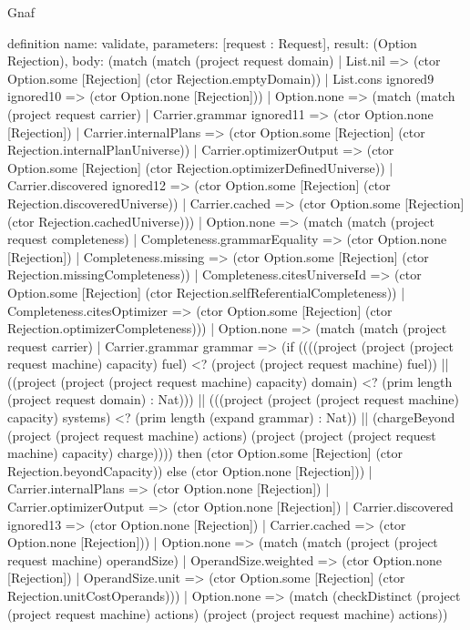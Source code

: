 \begin{lexlean}{Gnaf}
\begin{semanticmodule}
definition{
  name: validate,
  parameters: [request : Request],
  result: (Option Rejection),
  body: (match (match (project request domain)
      | List.nil => (ctor Option.some [Rejection] (ctor Rejection.emptyDomain))
      | List.cons ignored9 ignored10 => (ctor Option.none [Rejection]))
    | Option.none => (match (match (project request carrier)
        | Carrier.grammar ignored11 => (ctor Option.none [Rejection])
        | Carrier.internalPlans => (ctor Option.some [Rejection] (ctor Rejection.internalPlanUniverse))
        | Carrier.optimizerOutput => (ctor Option.some [Rejection] (ctor Rejection.optimizerDefinedUniverse))
        | Carrier.discovered ignored12 => (ctor Option.some [Rejection] (ctor Rejection.discoveredUniverse))
        | Carrier.cached => (ctor Option.some [Rejection] (ctor Rejection.cachedUniverse)))
      | Option.none => (match (match (project request completeness)
          | Completeness.grammarEquality => (ctor Option.none [Rejection])
          | Completeness.missing => (ctor Option.some [Rejection] (ctor Rejection.missingCompleteness))
          | Completeness.citesUniverseId => (ctor Option.some [Rejection] (ctor Rejection.selfReferentialCompleteness))
          | Completeness.citesOptimizer => (ctor Option.some [Rejection] (ctor Rejection.optimizerCompleteness)))
        | Option.none => (match (match (project request carrier)
            | Carrier.grammar grammar => (if ((((project (project (project request machine) capacity) fuel) <? (project (project request machine) fuel)) || ((project (project (project request machine) capacity) domain) <? (prim length (project request domain) : Nat))) || (((project (project (project request machine) capacity) systems) <? (prim length (expand grammar) : Nat)) || (chargeBeyond (project (project request machine) actions) (project (project (project request machine) capacity) charge)))) then (ctor Option.some [Rejection] (ctor Rejection.beyondCapacity)) else (ctor Option.none [Rejection]))
            | Carrier.internalPlans => (ctor Option.none [Rejection])
            | Carrier.optimizerOutput => (ctor Option.none [Rejection])
            | Carrier.discovered ignored13 => (ctor Option.none [Rejection])
            | Carrier.cached => (ctor Option.none [Rejection]))
          | Option.none => (match (match (project (project request machine) operandSize)
              | OperandSize.weighted => (ctor Option.none [Rejection])
              | OperandSize.unit => (ctor Option.some [Rejection] (ctor Rejection.unitCostOperands)))
            | Option.none => (match (checkDistinct (project (project request machine) actions) (project (project request machine) actions))
}
\end{semanticmodule}
\end{lexlean}
